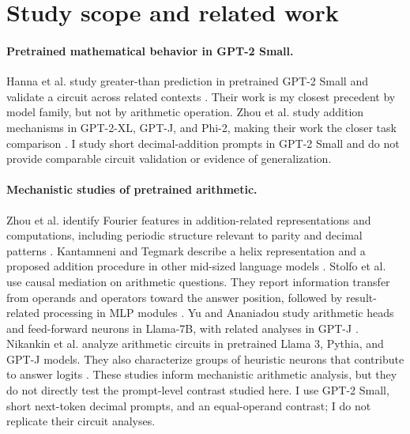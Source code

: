 \documentclass[11pt]{article}
\begin{document}
\section{Study scope and related work}

\paragraph{Pretrained mathematical behavior in GPT-2 Small.} Hanna et al. study greater-than prediction in pretrained GPT-2 Small and validate a circuit across related contexts \cite{hanna2023greater}. Their work is my closest precedent by model family, but not by arithmetic operation. Zhou et al. study addition mechanisms in GPT-2-XL, GPT-J, and Phi-2, making their work the closer task comparison \cite{zhou2024fourier}. I study short decimal-addition prompts in GPT-2 Small and do not provide comparable circuit validation or evidence of generalization.

\paragraph{Mechanistic studies of pretrained arithmetic.} Zhou et al. identify Fourier features in addition-related representations and computations, including periodic structure relevant to parity and decimal patterns \cite{zhou2024fourier}. Kantamneni and Tegmark describe a helix representation and a proposed addition procedure in other mid-sized language models \cite{kantamneni2025trigonometry}. Stolfo et al. use causal mediation on arithmetic questions. They report information transfer from operands and operators toward the answer position, followed by result-related processing in MLP modules \cite{stolfo2023causal}. Yu and Ananiadou study arithmetic heads and feed-forward neurons in Llama-7B, with related analyses in GPT-J \cite{yu2024cna}. Nikankin et al. analyze arithmetic circuits in pretrained Llama 3, Pythia, and GPT-J models. They also characterize groups of heuristic neurons that contribute to answer logits \cite{nikankin2025heuristics}. These studies inform mechanistic arithmetic analysis, but they do not directly test the prompt-level contrast studied here. I use GPT-2 Small, short next-token decimal prompts, and an equal-operand contrast; I do not replicate their circuit analyses.
\end{document}
